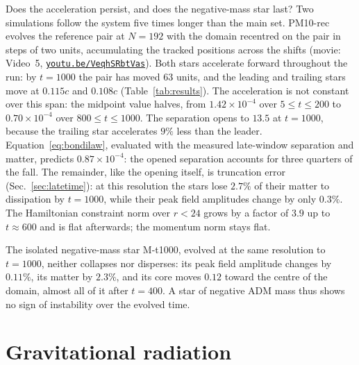 \documentclass[twocolumn,floatfix,aps,prd,superscriptaddress,nofootinbib]{revtex4-2}
\begin{document}
Does the acceleration persist, and does the negative-mass star last? Two simulations follow the system five times longer than the main set. PM10-rec evolves the reference pair at $N=192$ with the domain recentred on the pair in steps of two units, accumulating the tracked positions across the shifts (movie: Video~5, \href{https://youtu.be/VeqhSRbtVas}{\nolinkurl{youtu.be/VeqhSRbtVas}}). Both stars accelerate forward throughout the run: by $t=1000$ the pair has moved 63 units, and the leading and trailing stars move at $0.115c$ and $0.108c$ (Table~\ref{tab:results}). The acceleration is not constant over this span: the midpoint value halves, from $1.42\times10^{-4}$ over $5\le t\le200$ to $0.70\times10^{-4}$ over $800\le t\le1000$. The separation opens to $13.5$ at $t=1000$, because the trailing star accelerates $9\%$ less than the leader. Equation~\eqref{eq:bondilaw}, evaluated with the measured late-window separation and matter, predicts $0.87\times10^{-4}$: the opened separation accounts for three quarters of the fall. The remainder, like the opening itself, is truncation error (Sec.~\ref{sec:latetime}): at this resolution the stars lose $2.7\%$ of their matter to dissipation by $t=1000$, while their peak field amplitudes change by only $0.3\%$. The Hamiltonian constraint norm over $r<24$ grows by a factor of $3.9$ up to $t\approx600$ and is flat afterwards; the momentum norm stays flat.

The isolated negative-mass star M-t1000, evolved at the same resolution to $t=1000$, neither collapses nor disperses: its peak field amplitude changes by $0.11\%$, its matter by $2.3\%$, and its core moves $0.12$ toward the centre of the domain, almost all of it after $t=400$. A star of negative ADM mass thus shows no sign of instability over the evolved time.

\section{Gravitational radiation}
\label{sec:weyl}
\end{document}

